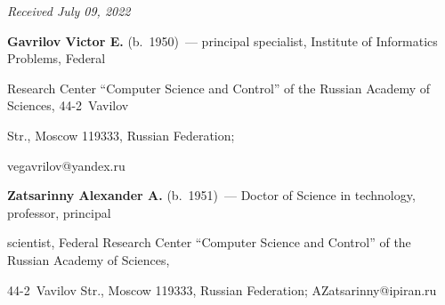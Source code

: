 \vspace*{-3pt}





\hfill{\small\textit{Received July 09, 2022}} 













\Contr








\noindent


\textbf{Gavrilov Victor E.} (b.\ 1950)~--- principal specialist, Institute of Informatics Problems, Federal 


Research Center ``Computer Science and Control'' of the Russian Academy of Sciences, 44-2~Vavilov 


Str., Moscow 119333, Russian Federation; 


\mbox{vegavrilov@yandex.ru}





\vspace*{3pt}





\noindent


\textbf{Zatsarinny Alexander A.} (b.\ 1951)~--- Doctor of Science in technology, professor, principal 


scientist, Federal Research Center ``Computer Science and Control'' of the Russian Academy of Sciences, 


44-2~Vavilov Str., Moscow 119333, Russian Federation; \mbox{AZatsarinny@ipiran.ru}














 


\label{end\stat}





\renewcommand{\bibname}{\protect\rm Литература} 


